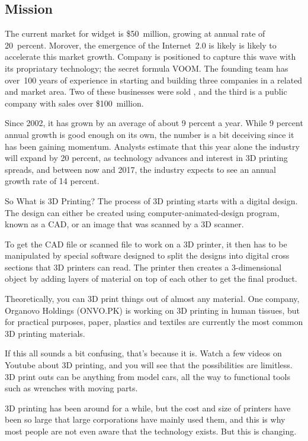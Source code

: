 \documentclass[11pt,a4paper,titlepage]{article}
\begin{document}
\subsection{Mission}
The current market for widget is \$50~million, growing at annual rate of 20~percent. Morover, the emergence of the Internet~2.0 is likely is likely to accelerate this market growth. Company \ego{} is positioned to capture this wave with its propriatary technology; the secret formula VOOM. The founding team has over~100 years of experience in starting and building three companies in a related and market area. Two of these businesses were sold , and the third is a public company with sales over \$100~million.

Since 2002, it has grown by an average of about 9 percent a year. While 9 percent annual growth is good enough on its own, the number is a bit deceiving since it has been gaining momentum. Analysts estimate that this year alone the industry will expand by 20 percent, as technology advances and interest in 3D printing spreads, and between now and 2017, the industry expects to see an annual growth rate of 14 percent.

So What is 3D Printing?
The process of 3D printing starts with a digital design. The design can either be created using computer-animated-design program, known as a CAD, or an image that was scanned by a 3D scanner.

To get the CAD file or scanned file to work on a 3D printer, it then has to be manipulated by special software designed to split the designs into digital cross sections that 3D printers can read. The printer then creates a 3-dimensional object by adding layers of material on top of each other to get the final product.

Theoretically, you can 3D print things out of almost any material. One company, Organovo Holdings (ONVO.PK) is working on 3D printing in human tissues, but for practical purposes, paper, plastics and textiles are currently the most common 3D printing materials.

If this all sounds a bit confusing, that's because it is. Watch a few videos on Youtube about 3D printing, and you will see that the possibilities are limitless. 3D print outs can be anything from model cars, all the way to functional tools such as wrenches with moving parts.

3D printing has been around for a while, but the cost and size of printers have been so large that large corporations have mainly used them, and this is why most people are not even aware that the technology exists. But this is changing.
\end{document}
